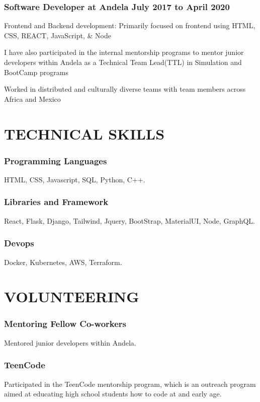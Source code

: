 \documentclass{article}
\begin{document}
\subsubsection{Software Developer at Andela\hspace{190pt} \textbf{July 2017 to April 2020}}
\begin{description}[font=$\bullet$~\normalfont\scshape\color{red!50!black}]
  \item{Frontend and Backend development: Primarily focused on frontend using HTML, CSS, REACT, JavaScript, \& Node}
  \item{I have also participated in the internal mentorship programs to mentor junior developers within Andela as a Technical Team Lead(TTL) in Simulation and BootCamp programs}
  \item{Worked in distributed and culturally diverse teams with team members across Africa and Mexico}
\end{description}
\section{TECHNICAL SKILLS}
\subsubsection{Programming Languages}
HTML, CSS, Javascript, SQL, Python, C++.
\subsubsection{Libraries and Framework}
React, Flask, Django, Tailwind, Jquery, BootStrap, MaterialUI, Node, GraphQL.
\subsubsection{Devops}
Docker, Kubernetes, AWS, Terraform.
\section{VOLUNTEERING}
\subsubsection{Mentoring Fellow Co-workers}
\begin{description}[font=$\bullet$~\normalfont\scshape\color{red!50!black}]
  \item{Mentored junior developers within Andela.}
\end{description}
\subsubsection{TeenCode}
\begin{description}[font=$\bullet$~\normalfont\scshape\color{red!50!black}]
  \item{Participated in the TeenCode mentorship program, which is an outreach program aimed at educating high school students how to code at and early age.}
\end{description}
\end{document}
